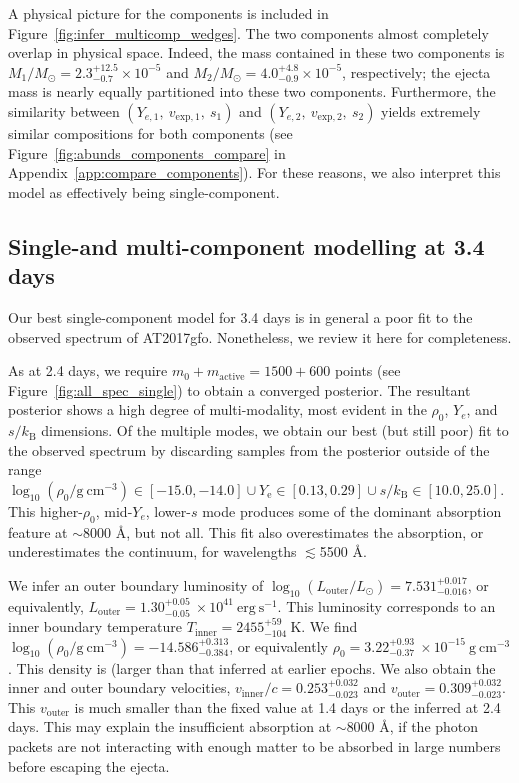 \documentclass[twocolumn,twocolappendix]{aastex63}
\begin{document}
A physical picture for the components is included in Figure~\ref{fig:infer_multicomp_wedges}. The two components almost completely overlap in physical space. Indeed, the mass contained in these two components is $M_1/M_{\odot} = 2.3^{+12.5}_{-0.7} \times 10^{-5}$ and $M_2/M_{\odot} = 4.0^{+4.8}_{-0.9} \times 10^{-5}$, respectively; the ejecta mass is nearly equally partitioned into these two components. Furthermore, the similarity between $(Y_{e,1},~v_{\mathrm{exp},1},~s_1)$ and $(Y_{e,2},~v_{\mathrm{exp},2},~s_2)$ yields extremely similar compositions for both components (see Figure~\ref{fig:abunds_components_compare} in Appendix~\ref{app:compare_components}). For these reasons, we also interpret this model as effectively being single-component.




\subsection{Single-and multi-component modelling at 3.4 days}\label{ssc:3.4}

Our best single-component model for 3.4 days is in general a poor fit to the observed spectrum of AT2017gfo. Nonetheless, we review it here for completeness.

As at 2.4 days, we require $m_0 + m_{\mathrm{active}} = 1500 + 600$ points (see Figure~\ref{fig:all_spec_single}) to obtain a converged posterior. The resultant posterior shows a high degree of multi-modality, most evident in the $\rho_0$, $Y_e$, and $s / k_{\mathrm{B}}$ dimensions. Of the multiple modes, we obtain our best (but still poor) fit to the observed spectrum by discarding samples from the posterior outside of the range $\log_{10}(\rho_0 / \mathrm{g~cm^{-3}}) \in [-15.0, -14.0] \cup Y_{\mathrm{e}} \in [0.13, 0.29] \cup s/k_{\mathrm{B}} \in [10.0, 25.0]$. This higher-$\rho_0$, mid-$Y_e$, lower-$s$ mode produces some of the dominant absorption feature at $\sim$8000 \AA, but not all. This fit also overestimates the absorption, or underestimates the continuum, for wavelengths $\lesssim$5500 \AA. 

We infer an outer boundary luminosity of $\log_{10} (L_{\mathrm{outer}}/L_{\odot}) = 7.531^{+0.017}_{-0.016}$, or equivalently, $L_{\mathrm{outer}} = 1.30^{+0.05}_{-0.05}~\times 10^{41}~\mathrm{erg~s^{-1}}$. This luminosity corresponds to an inner boundary temperature $T_{\mathrm{inner}} = 2455^{+59}_{-104}~\mathrm{K}$. We find $\log_{10} (\rho_0 / \mathrm{g~cm^{-3}}) = -14.586^{+0.313}_{-0.384}$, or equivalently $\rho_0 = 3.22^{+0.93}_{-0.37}~\times 10^{-15}~\mathrm{g~cm^{-3}}$. This density is (larger than that inferred at earlier epochs. We also obtain the inner and outer boundary velocities, $v_{\mathrm{inner}}/c = 0.253^{+0.032}_{-0.023}$ and $v_{\mathrm{outer}} = 0.309^{+0.032}_{-0.023}$. This $v_{\mathrm{outer}}$ is much smaller than the fixed value at 1.4 days or the inferred at 2.4 days. This may explain the insufficient absorption at $\sim8000$ \AA, if the photon packets are not interacting with enough matter to be absorbed in large numbers before escaping the ejecta.
\end{document}
